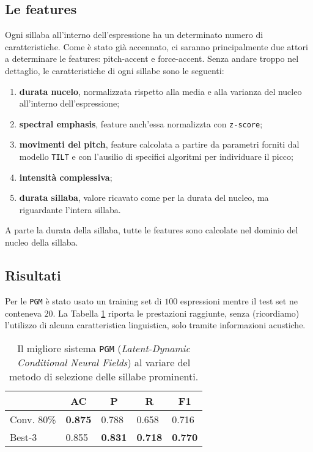 \documentclass[twoside,twocolumn,11pt]{extarticle}
\theoremstyle{definition}
\begin{document}
	\subsection{Le features}
		Ogni sillaba all'interno dell'espressione ha un determinato numero di caratteristiche. Come è stato già accennato, ci saranno principalmente due attori a determinare le features: pitch-accent e force-accent. Senza andare troppo nel dettaglio, le caratteristiche di ogni sillabe sono le seguenti:
		\begin{enumerate}
			\item \textbf{durata nucelo}, normalizzata rispetto alla media e alla varianza del nucleo all'interno dell'espressione;
			\item \textbf{spectral emphasis}, feature anch'essa normalizzta con \texttt{z-score};
			\item \textbf{movimenti del pitch}, feature calcolata a partire da parametri forniti dal modello \texttt{TILT} e con l'ausilio di specifici algoritmi per individuare il picco;
			\item \textbf{intensità complessiva};
			\item \textbf{durata sillaba}, valore ricavato come per la durata del nucleo, ma riguardante l'intera sillaba.
		\end{enumerate}
		A parte la durata della sillaba, tutte le features sono calcolate nel dominio del nucleo della sillaba.
		
	\subsection{Risultati}
		Per le \texttt{PGM} è stato usato un training set di $100$ espressioni mentre il test set ne conteneva $20$. La Tabella \ref{tab:pgm} riporta le prestazioni raggiunte, senza (ricordiamo) l'utilizzo di alcuna caratteristica linguistica, solo tramite informazioni acustiche.
		\begin{table}[ht!]
			\centering
			\caption{Il migliore sistema \texttt{PGM} (\textit{Latent-Dynamic Conditional Neural Fields}) al variare del metodo di selezione delle sillabe prominenti.}
			\label{tab:pgm}
			\begin{tabular}{lllll}
				\hline
				& \multicolumn{1}{c}{AC} & \multicolumn{1}{c}{P} & \multicolumn{1}{c}{R} & \multicolumn{1}{c}{F1} \\ \hline
				Conv. 80\% & \textbf{0.875}         & 0.788                 & 0.658                 & 0.716                  \\
				Best-3     & 0.855                  & \textbf{0.831}        & \textbf{0.718}        & \textbf{0.770}         \\ \hline
			\end{tabular}
		\end{table}
	
\end{document}
